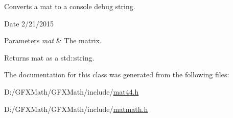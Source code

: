 Converts a mat to a console debug string. 

\begin{DoxyDate}{Date}
2/21/2015
\end{DoxyDate}

\begin{DoxyParams}{Parameters}
{\em mat} & The matrix.\\
\hline
\end{DoxyParams}
\begin{DoxyReturn}{Returns}
mat as a std\+::string. 
\end{DoxyReturn}


The documentation for this class was generated from the following files\+:\begin{DoxyCompactItemize}
\item 
D\+:/\+G\+F\+X\+Math/\+G\+F\+X\+Math/include/\hyperlink{mat44_8h}{mat44.\+h}\item 
D\+:/\+G\+F\+X\+Math/\+G\+F\+X\+Math/include/\hyperlink{matmath_8h}{matmath.\+h}\end{DoxyCompactItemize}
